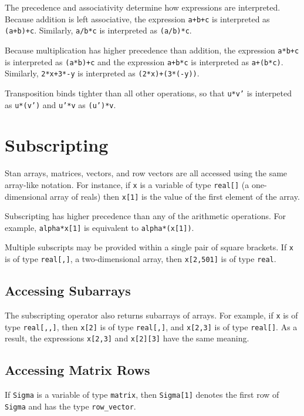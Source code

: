 \documentclass[10pt]{report}
\newcommand{\Stan}{Stan\xspace}
\newcommand{\code}[1]{{\tt #1}}
\begin{document}
The precedence and associativity determine how expressions are
interpreted.  Because addition is left associative, the expression
\code{a+b+c} is interpreted as \code{(a+b)+c}.  Similarly,
\code{a/b*c} is interpreted as \code{(a/b)*c}.  

Because multiplication has higher precedence than addition, the
expression \code{a*b+c} is interpreted as \code{(a*b)+c} and the
expression \code{a+b*c} is interpreted as \code{a+(b*c)}.  Similarly,
\code{2*x+3*-y} is interpreted as \code{(2*x)+(3*(-y))}.

Transposition binds tighter than all other operations, so that
\code{u*v'} is interpeted as \code{u*(v')} and \code{u'*v} as
\code{(u')*v}.

\section{Subscripting}

\Stan arrays, matrices, vectors, and row vectors are all accessed
using the same array-like notation.  For instance, if \code{x} is a
variable of type \code{real[]} (a one-dimensional array of reals)
then \code{x[1]} is the value of the first element of the
array.  

Subscripting has higher precedence than any of the arithmetic
operations.  For example, \code{alpha*x[1]} is equivalent to
\code{alpha*(x[1])}.  

Multiple subscripts may be provided within a single pair of square
brackets.  If \code{x} is of type \code{real[,]}, a two-dimensional
array, then \code{x[2,501]} is of type \code{real}.

\subsection{Accessing Subarrays}

The subscripting operator also returns subarrays of arrays.  For
example, if \code{x} is of type \code{real[,,]}, then \code{x[2]}
is of type \code{real[,]}, and \code{x[2,3]} is of type
\code{real[]}.  As a result, the expressions \code{x[2,3]} and
\code{x[2][3]} have the same meaning.  

\subsection{Accessing Matrix Rows}

If \code{Sigma} is a variable of type \code{matrix}, then
\code{Sigma[1]} denotes the first row of \code{Sigma} and has the
type \code{row\_vector}.  
\end{document}
